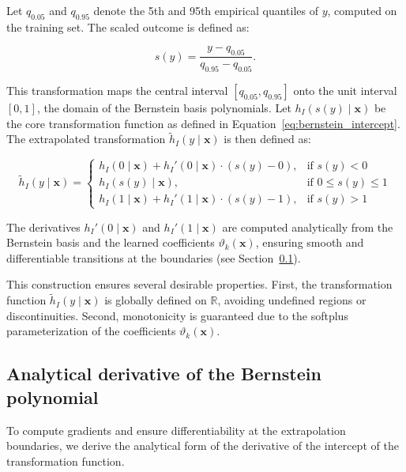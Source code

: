 Let $q_{0.05}$ and $q_{0.95}$ denote the 5th and 95th empirical quantiles of $y$, computed on the training set. The scaled outcome is defined as:

\begin{equation}
s(y) = \frac{y - q_{0.05}}{q_{0.95} - q_{0.05}}.
\end{equation}

This transformation maps the central interval $[q_{0.05}, q_{0.95}]$ onto the unit interval $[0, 1]$, the domain of the Bernstein basis polynomials. Let $h_I(s(y) \mid \mathbf{x})$ be the core transformation function as defined in Equation~\eqref{eq:bernstein_intercept}. The extrapolated transformation $\tilde{h}_I(y \mid \mathbf{x})$ is then defined as:

\begin{equation}
\tilde{h}_I(y \mid \mathbf{x}) =
\begin{cases}
h_I(0 \mid \mathbf{x}) + h_I'(0 \mid \mathbf{x}) \cdot (s(y) - 0), & \text{if } s(y) < 0 \\
h_I(s(y) \mid \mathbf{x}), & \text{if } 0 \leq s(y) \leq 1 \\
h_I(1 \mid \mathbf{x}) + h_I'(1 \mid \mathbf{x}) \cdot (s(y) - 1), & \text{if } s(y) > 1
\end{cases}
\label{eq:extended_bernstein}
\end{equation}

The derivatives $h_I'(0 \mid \mathbf{x})$ and $h_I'(1 \mid \mathbf{x})$ are computed analytically from the Bernstein basis and the learned coefficients $\vartheta_k(\mathbf{x})$, ensuring smooth and differentiable transitions at the boundaries (see Section~\ref{sec:analytical_derivative_bernstein}).

This construction ensures several desirable properties. First, the transformation function $\tilde{h}_I(y \mid \mathbf{x})$ is globally defined on $\mathbb{R}$, avoiding undefined regions or discontinuities. Second, monotonicity is guaranteed due to the softplus parameterization of the coefficients $\vartheta_k(\mathbf{x})$.




\subsection{Analytical derivative of the Bernstein polynomial} \label{sec:analytical_derivative_bernstein}

To compute gradients and ensure differentiability at the extrapolation boundaries, we derive the analytical form of the derivative of the intercept of the transformation function.

